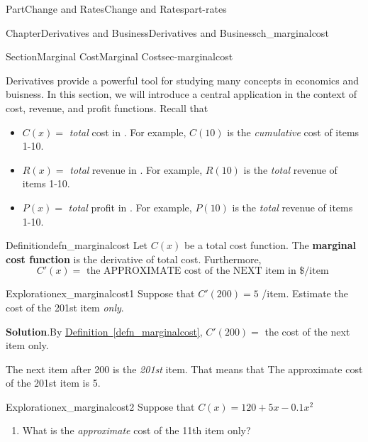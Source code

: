 \documentclass{tufte-book}
\newcommand{\blocktitlefont}{\relax}
\newcommand{\xreffont}{\relax}
\newcommand{\terminology}[1]{\textbf{#1}}
\numberwithin{equation}{chapter}
\begin{document}
\begin{partptx}{Part}{Change and Rates}{}{Change and Rates}{}{}{part-rates}
\begin{chapterptx}{Chapter}{Derivatives and Business}{}{Derivatives and Business}{}{}{ch_marginalcost}
\typeout{************************************************}
%
\begin{sectionptx}{Section}{Marginal Cost}{}{Marginal Cost}{}{}{sec-marginalcost}
\begin{introduction}{}%
Derivatives provide a powerful tool for studying many concepts in economics and buisness.  In this section, we will introduce a central application in the context of cost, revenue, and profit functions. Recall that%
\begin{itemize}[label=\textbullet]
\item{}\(C(x) = \) \emph{total} cost in \textdollar{}.  For example, \(C(10)\) is the \emph{cumulative} cost of items 1-10.%
\item{}\(R(x) = \) \emph{total} revenue in \textdollar{}.  For example, \(R(10)\) is the \emph{total} revenue of items 1-10.%
\item{}\(P(x) = \) \emph{total} profit in \textdollar{}.  For example, \(P(10)\) is the \emph{total} revenue of items 1-10.%
\end{itemize}
%
\end{introduction}%
\begin{definition}{Definition}{}{defn_marginalcost}%
Let \(C(x)\) be a total cost function. The \terminology{marginal cost function} is the derivative of total cost. Furthermore,%
\begin{equation*}
C'(x) = \text{ the APPROXIMATE cost of the NEXT item in \$/item }
\end{equation*}
%
\end{definition}
\begin{exploration}{Exploration}{}{ex_marginalcost1}%
Suppose that \(C'(200) = 5\) \textdollar{}\slash{}item. Estimate the cost of the 201st item \emph{only}.%
\par\smallskip%
\noindent\textbf{\blocktitlefont Solution}.\hypertarget{ex_marginalcost1-2}{}\quad{}By \hyperref[defn_marginalcost]{Definition~{\xreffont\ref{defn_marginalcost}}}, \(C'(200) = \) the cost of the next item only.%
\par
The next item after 200 is the \emph{201st} item.  That means that The approximate cost of the 201st item is 5\textdollar{}.%
\end{exploration}%
\begin{exploration}{Exploration}{}{ex_marginalcost2}%
Suppose that \(C(x) = 120 + 5x - 0.1 x^2\)%
\begin{enumerate}[font=\bfseries,label=(\alph*),ref=\alph*]%
\item{}What is the \emph{approximate} cost of the 11th item only?%

\end{enumerate}
\end{exploration}
\end{sectionptx}
\end{chapterptx}
\end{partptx}
\end{document}
